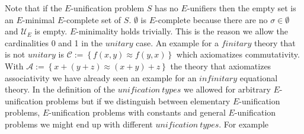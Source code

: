 Note that if the $E$-unification problem $S$ has no $E$-unifiers then the empty set is an $E$-minimal $E$-complete set of $S$. $\emptyset$ is $E$-complete because there are no $\sigma\in\emptyset$ and $\mathcal{U}_E$ is empty. $E$-minimality holds trivially. This is the reason we allow the cardinalities 0 and 1 in the $unitary$ case.
An example for a $finitary$ theory that is not $unitary$ is $\mathcal{C}:=\left\lbrace f(x,y)\approx f(y,x)\right\rbrace$ which axiomatizes commutativity.
With $\mathcal{A}:=\left\lbrace x+(y+z)\approx (x+y)+z\right\rbrace$ the theory that axiomatizes associativity we have already seen an example for an $infinitary$ equational theory.
In the definition of the $unification\ types$ we allowed for arbitrary $E$-unification problems but if we distinguish between elementary $E$-unification problems, $E$-unification problems with constants and general $E$-unification problems we might end up with different $unification\ types$. For example 
